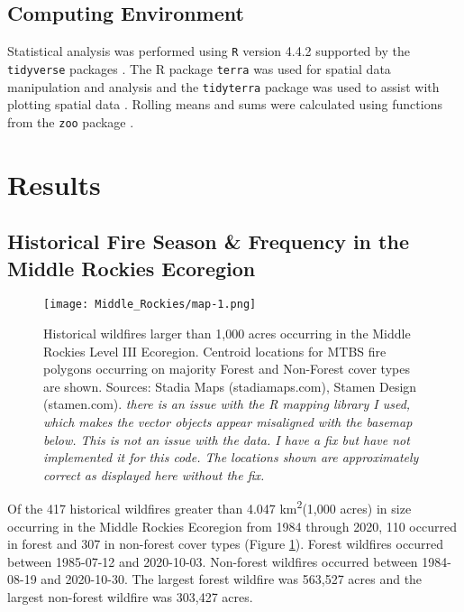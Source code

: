 \documentclass[11pt]{article}
\begin{document}
\subsection{Computing Environment}

Statistical analysis was performed using \texttt{R} version 4.4.2 \citep{rcoreteamLanguageEnvironmentStatistical2024} supported by the \texttt{tidyverse} packages \citep{hernangomezUsingTidyverseTerra2023} .  The R package \texttt{terra} was used for spatial data manipulation and analysis \citep{hijmansTerraSpatialData2024} and the \texttt{tidyterra} package was used to assist with plotting spatial data \citep{hernangomezUsingTidyverseTerra2023}.  Rolling means and sums were calculated using functions from the \texttt{zoo} package \citep{zeileisZooS3Infrastructure2005}.  

\section{Results}

\subsection{Historical Fire Season \& Frequency in the Middle Rockies Ecoregion}

\begin{figure}[ht]
  \texttt{[image: Middle\_Rockies/map-1.png]}
  \caption{Historical wildfires larger than 1,000 acres occurring in the Middle Rockies Level III Ecoregion.  Centroid locations for MTBS fire polygons occurring on majority Forest and Non-Forest cover types are shown.  Sources: Stadia Maps (stadiamaps.com), Stamen Design (stamen.com). \textit{there is an issue with the R mapping library I used, which makes the vector objects appear misaligned with the basemap below.  This is not an issue with the data. I have a fix but have not implemented it for this code.  The locations shown are approximately correct as displayed here without the fix.}}
  \label{fig:map}
\end{figure}

Of the 417 historical wildfires greater than 4.047 km\textsuperscript{2}(1,000 acres) in size occurring in the Middle Rockies Ecoregion from 1984 through 2020, 110 occurred in forest and 307 in non-forest cover types (Figure \ref{fig:map}).  Forest wildfires occurred between 1985-07-12 and 2020-10-03.  Non-forest wildfires occurred between 1984-08-19 and 2020-10-30.  The largest forest wildfire was 563,527 acres and the largest non-forest wildfire was 303,427 acres.
\end{document}
